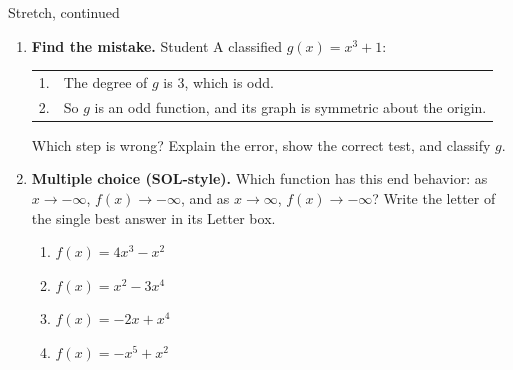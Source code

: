 \documentclass[12pt]{article}
\begin{document}
\boxguard[24]
\begin{notesbox}{Stretch, continued}
\small
\begin{enumerate}[leftmargin=1.9em, itemsep=10pt, start=4]
  \item \textbf{Find the mistake.} Student A classified $g(x)=x^3+1$:
    \begin{center}
    \begin{tabular}{@{}r@{\;}l@{}}
      1. & The degree of $g$ is $3$, which is odd. \\
      2. & So $g$ is an odd function, and its graph is symmetric about the origin. \\
    \end{tabular}
    \end{center}
    Which step is wrong? Explain the error, show the correct test, and classify $g$.
    \rubricbox{\gradedblank[id=q4, type=rubric, points=3, display={Step 2. An odd degree does not make an odd function; test $g(-x)$. $g(-x)=-x^3+1$, which is neither $g(x)=x^3+1$ nor $-g(x)=-x^3-1$, so $g$ is neither (the constant $1$ is an even power, $x^0$).}]{\linewidth}{2in}}

  \item \textbf{Multiple choice (SOL-style).} Which function has this end behavior: as
    $x\to-\infty$, $f(x)\to-\infty$, and as $x\to\infty$, $f(x)\to-\infty$? Write the letter of
    the single best answer in its Letter box.
    \begin{enumerate}[label=(\Alph*), leftmargin=2.0em, itemsep=1pt]
      \item $f(x)=4x^3-x^2$
      \item $f(x)=x^2-3x^4$
      \item $f(x)=-2x+x^4$
      \item $f(x)=-x^5+x^2$
    \end{enumerate}
\end{enumerate}
\end{notesbox}
\end{document}

